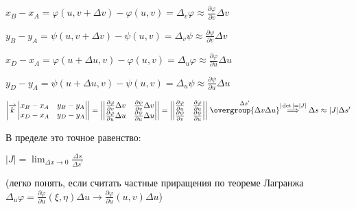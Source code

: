 \documentclass[12pt]{article}
\begin{document}
    $x_B - x_A = \varphi(u, v + \Delta v) - \varphi(u, v) = \Delta_v \varphi \approx \frac{\partial \varphi}{\partial v}\Delta v$

    $y_B - y_A = \psi(u, v + \Delta v) - \psi(u, v) = \Delta_v \psi \approx \frac{\partial \psi}{\partial v}\Delta v$

    $x_D - x_A = \varphi(u + \Delta u, v) - \varphi(u, v) = \Delta_u \varphi \approx \frac{\partial \varphi}{\partial u}\Delta u$

    $y_D - y_A = \psi(u + \Delta u, v) - \psi(u, v) = \Delta_u \psi \approx \frac{\partial \psi}{\partial u}\Delta u$

    $\left| \overrightarrow{k}
    \begin{vmatrix}
        x_B - x_A & y_B - y_A \\
        x_D - x_A & y_D - y_A
    \end{vmatrix}\right| = \left|
    \begin{vmatrix}
        \frac{\partial \varphi}{\partial v}\Delta v & \frac{\partial \psi}{\partial v}\Delta v \\
        \frac{\partial \varphi}{\partial u}\Delta u & \frac{\partial \psi}{\partial u}\Delta u
    \end{vmatrix}\right| = \left|
    \begin{vmatrix}
        \frac{\partial \varphi}{\partial u} & \frac{\partial \varphi}{\partial u} \\
        \frac{\partial \psi}{\partial v}    & \frac{\partial \psi}{\partial u}
    \end{vmatrix}\right| \stackrel{\Delta s^\prime}{\overgroup{\Delta v \Delta u}} \stackrel{|\det| = |J|}{\Longrightarrow} \Delta s \approx |J|\Delta s^\prime$

    \Nota В пределе это точное равенство:

    $|J| = \lim_{\Delta x \to 0} \frac{\Delta s}{\Delta s^\prime}$

    (легко понять, если считать частные приращения по теореме Лагранжа $\Delta_u \varphi = \frac{\partial \varphi}{\partial u}(\xi, \eta) \Delta u \rightarrow \frac{\partial \varphi}{\partial u}(u, v) \Delta u$)

    \hypertarget{determinantJaсobi}{}
\end{document}
